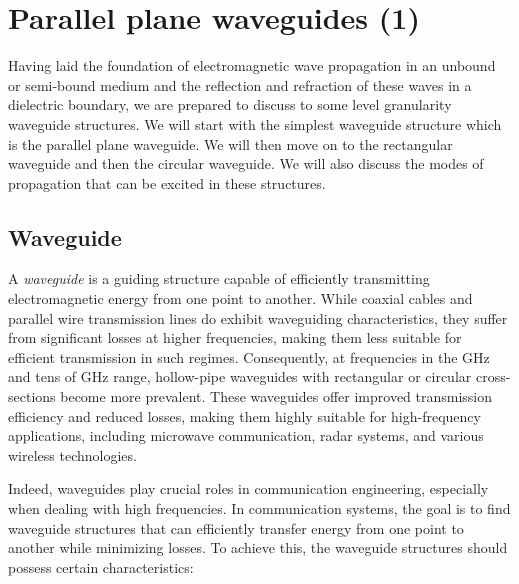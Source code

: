 

\chapter{Parallel plane waveguides (1)}\label{lec:lec35}
Having laid the foundation of electromagnetic wave propagation in an unbound or semi-bound medium and the reflection and refraction of these waves in a dielectric boundary, we are prepared to discuss to some level granularity waveguide structures. We will start with the simplest waveguide structure which is the parallel plane waveguide. We will then move on to the rectangular waveguide and then the circular waveguide. We will also discuss the modes of propagation that can be excited in these structures.

\section{Waveguide}
A \textit{waveguide} is a guiding structure capable of efficiently transmitting electromagnetic energy from one point to another. While coaxial cables and parallel wire transmission lines do exhibit waveguiding characteristics, they suffer from significant losses at higher frequencies, making them less suitable for efficient transmission in such regimes. Consequently, at frequencies in the GHz and tens of GHz range, hollow-pipe waveguides with rectangular or circular cross-sections become more prevalent. These waveguides offer improved transmission efficiency and reduced losses, making them highly suitable for high-frequency applications, including microwave communication, radar systems, and various wireless technologies.

Indeed, waveguides play crucial roles in communication engineering, especially when dealing with high frequencies. In communication systems, the goal is to find waveguide structures that can efficiently transfer energy from one point to another while minimizing losses. To achieve this, the waveguide structures should possess certain characteristics:

